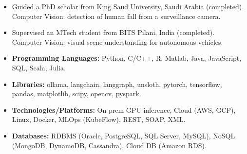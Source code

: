 \documentclass[11pt,a4paper]{article}
\begin{document}
\spacedhrule{-0.4em}{0.5em}



\begin{itemize}[leftmargin=1cm, itemsep=-0.1cm]
	\item Guided a PhD scholar from King Saud University, Saudi Arabia (completed). Computer Vision: detection of human fall from a surveillance camera.
	\item Supervised an MTech student from BITS Pilani, India (completed). Computer Vision: visual scene understanding for autonomous vehicles.
\end{itemize}

\spacedhrule{-0.4em}{0.5em}



\begin{itemize}[leftmargin=1cm, itemsep=-0.1cm]
	\item \textbf{Programming Languages:} Python, C/C++, R, Matlab, Java, JavaScript, SQL, Scala, Julia.
	\item \textbf{Libraries:} ollama, langchain, langgraph, unsloth, pytorch, tensorflow, pandas, matplotlib, scipy, opencv, pyspark.
	\item \textbf{Technologies/Platforms:} On-prem GPU inference, Cloud (AWS, GCP), Linux, Docker, MLOps (KubeFlow), REST, SOAP, XML.
	\item \textbf{Databases:} RDBMS (Oracle, PostgreSQL, SQL Server, MySQL), NoSQL (MongoDB, DynamoDB, Cassandra), Cloud DB (Amazon RDS).
\end{itemize}

\spacedhrule{-0.2em}{0.5em}


\end{document}

